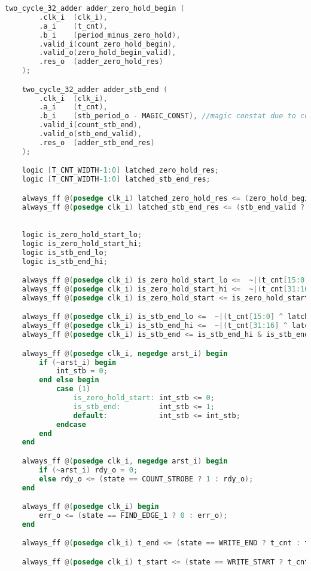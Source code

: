 \begin{lstlisting}[language=Verilog]
	two_cycle_32_adder adder_zero_hold_begin (
		.clk_i 	(clk_i),
		.a_i	(t_cnt),
		.b_i	(period_minus_zero_hold),
		.valid_i(count_zero_hold_begin),
		.valid_o(zero_hold_begin_valid),
		.res_o	(adder_zero_hold_res)
	);

	two_cycle_32_adder adder_stb_end (
		.clk_i 	(clk_i),
		.a_i	(t_cnt),
		.b_i	(stb_period_o - MAGIC_CONST), //magic constat due to computation pipeline
		.valid_i(count_stb_end),
		.valid_o(stb_end_valid),
		.res_o	(adder_stb_end_res)
	);

	logic [T_CNT_WIDTH-1:0] latched_zero_hold_res;
	logic [T_CNT_WIDTH-1:0] latched_stb_end_res;

	always_ff @(posedge clk_i) latched_zero_hold_res <= (zero_hold_begin_valid ? adder_zero_hold_res : latched_zero_hold_res);
	always_ff @(posedge clk_i) latched_stb_end_res <= (stb_end_valid ? adder_stb_end_res : latched_stb_end_res);

 
	logic is_zero_hold_start_lo;
	logic is_zero_hold_start_hi;
	logic is_stb_end_lo;
	logic is_stb_end_hi;

	always_ff @(posedge clk_i) is_zero_hold_start_lo <=  ~|(t_cnt[15:0] ^ latched_zero_hold_res[15:0]);  //t_cnt == latched_zero_hold_res;
	always_ff @(posedge clk_i) is_zero_hold_start_hi <=  ~|(t_cnt[31:16] ^ latched_zero_hold_res[31:16]);  //t_cnt == latched_zero_hold_res;
	always_ff @(posedge clk_i) is_zero_hold_start <= is_zero_hold_start_lo & is_zero_hold_start_hi; 

	always_ff @(posedge clk_i) is_stb_end_lo <=  ~|(t_cnt[15:0] ^ latched_stb_end_res[15:0]);  //t_cnt == latched_zero_hold_res;
	always_ff @(posedge clk_i) is_stb_end_hi <=  ~|(t_cnt[31:16] ^ latched_stb_end_res[31:16]);  //t_cnt == latched_zero_hold_res;
	always_ff @(posedge clk_i) is_stb_end <= is_stb_end_hi & is_stb_end_lo; 

	always_ff @(posedge clk_i, negedge arst_i) begin
		if (~arst_i) begin
			int_stb = 0;
		end else begin
			case (1) 
				is_zero_hold_start: int_stb <= 0;
				is_stb_end:			int_stb <= 1;
				default:			int_stb <= int_stb;
			endcase
		end
	end

	always_ff @(posedge clk_i, negedge arst_i) begin
		if (~arst_i) rdy_o = 0;
		else rdy_o <= (state == COUNT_STROBE ? 1 : rdy_o);
	end

	always_ff @(posedge clk_i) begin
		err_o <= (state == FIND_EDGE_1 ? 0 : err_o);
	end

	always_ff @(posedge clk_i) t_end <= (state == WRITE_END ? t_cnt : t_end);

	always_ff @(posedge clk_i) t_start <= (state == WRITE_START ? t_cnt : t_start);


\end{lstlisting}
